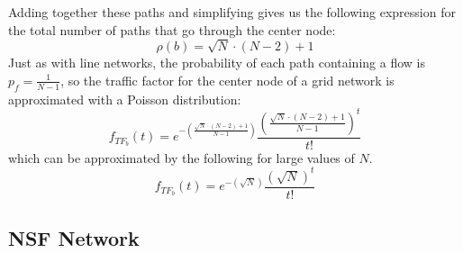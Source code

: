 Adding together these paths and simplifying gives us the following expression for the total number of paths that go through the center node: 
\begin{equation}
	\rho(b) = \sqrt{N} \cdot (N-2) + 1
\end{equation}
Just as with line networks, the probability of each path containing a flow is $p_f = \frac{1}{N-1}$, so the traffic factor for the center node of a grid network is approximated with a Poisson distribution:
\begin{equation*}
	f_{TF_b}(t) = e^{-(\frac{\sqrt{N}\cdot(N-2)+1}{N-1})}\frac{(\frac{\sqrt{N}\cdot(N-2)+1}{N-1})^{t}}{t!}
\end{equation*}
which can be approximated by the following for large values of $N$.  
\begin{equation*}
	f_{TF_b}(t) = e^{-(\sqrt{N})}\frac{(\sqrt{N})^{t}}{t!}
\end{equation*}


\subsection{NSF Network}

